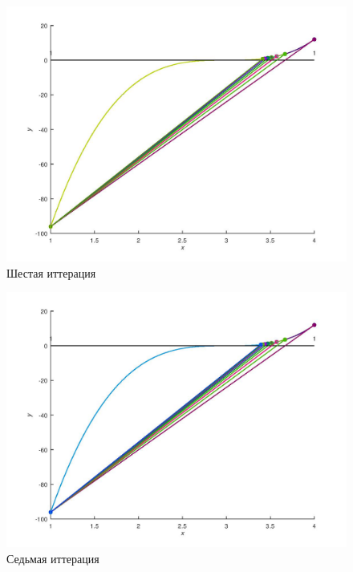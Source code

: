 \documentclass[a4paper,12pt]{article}
\begin{document}
    \begin{figure}[H]
        \centering
        \includegraphics[scale=0.4]{6secantitter.jpg}
        \caption{Шестая иттерация}
    \end{figure}
    \begin{figure}[H]
        \centering
        \includegraphics[scale=0.4]{7secantitter.jpg}
        \caption{Седьмая иттерация}
    \end{figure}
\end{document}
